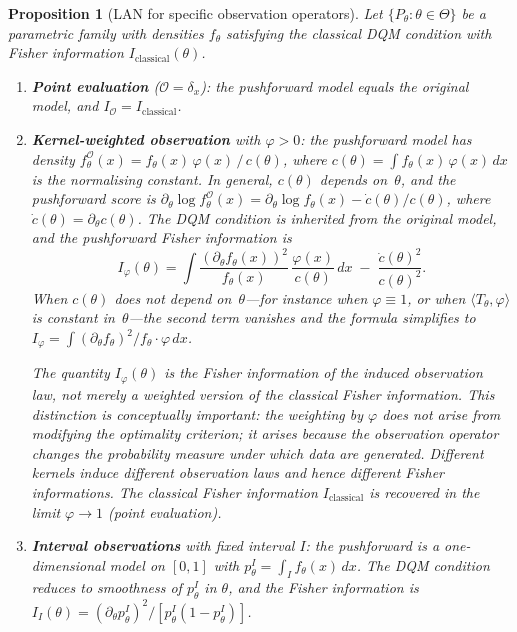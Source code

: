 \documentclass[11pt,a4paper]{article}
\newtheorem{proposition}[theorem]{Proposition}
\begin{document}
\begin{proposition}[LAN for specific observation operators]\label{prop:LAN-examples}
Let $\{P_\theta : \theta \in \Theta\}$ be a parametric family with
densities $f_\theta$ satisfying the classical DQM condition with Fisher
information $I_{\mathrm{classical}}(\theta)$.

\begin{enumerate}[label=(\alph*)]
\item \textbf{Point evaluation} ($\mathcal O = \delta_x$): the pushforward
model equals the original model, and $I_{\mathcal O} = I_{\mathrm{classical}}$.

\item \textbf{Kernel-weighted observation} with $\varphi > 0$: the pushforward
model has density
$f_\theta^{\mathcal O}(x) = f_\theta(x)\,\varphi(x)\,/\,c(\theta)$,
where $c(\theta) = \int f_\theta(x)\,\varphi(x)\,dx$ is the normalising
constant.  In general, $c(\theta)$ depends on~$\theta$, and the pushforward
score is
$\partial_\theta \log f_\theta^{\mathcal O}(x)
= \partial_\theta \log f_\theta(x) - \dot c(\theta)/c(\theta)$,
where $\dot c(\theta) = \partial_\theta c(\theta)$.
The DQM condition is inherited from the original model, and the pushforward
Fisher information is
\begin{equation}\label{eq:I-kernel}
I_\varphi(\theta)
= \int \frac{(\partial_\theta f_\theta(x))^2}{f_\theta(x)}\,
  \frac{\varphi(x)}{c(\theta)}\,dx
  \;-\; \frac{\dot c(\theta)^2}{c(\theta)^2}.
\end{equation}
When $c(\theta)$ does not depend on~$\theta$---for instance when
$\varphi \equiv 1$, or when $\langle T_\theta, \varphi\rangle$ is constant
in~$\theta$---the second term vanishes and the formula simplifies to
$I_\varphi = \int (\partial_\theta f_\theta)^2 / f_\theta \cdot \varphi\,dx$.

The quantity $I_\varphi(\theta)$ is \emph{the Fisher information of the
induced observation law}, not merely a weighted version of the classical
Fisher information.  This distinction is conceptually important:
\emph{the weighting by $\varphi$ does not arise from modifying the
optimality criterion; it arises because the observation operator changes
the probability measure under which data are generated.}  Different
kernels induce different observation laws and hence different Fisher
informations.  The classical Fisher information $I_{\mathrm{classical}}$
is recovered in the limit $\varphi \to 1$ (point evaluation).

\item \textbf{Interval observations} with fixed interval $I$: the
pushforward is a one-dimensional model on $[0,1]$ with
$p_\theta^I = \int_I f_\theta(x)\,dx$.  The DQM condition reduces to
smoothness of $p_\theta^I$ in $\theta$, and the Fisher information is
$I_I(\theta) = (\partial_\theta p_\theta^I)^2 / [p_\theta^I(1 - p_\theta^I)]$.
\end{enumerate}
\end{proposition}
\end{document}
